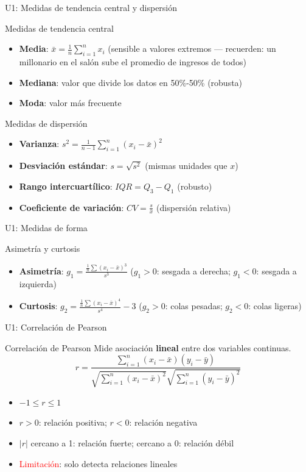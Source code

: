 \documentclass[aspectratio=169, 11pt]{beamer}
\begin{document}
\begin{frame}{U1: Medidas de tendencia central y dispersión}
\begin{block}{Medidas de tendencia central}
\begin{itemize}
\item \textbf{Media}: $\bar{x} = \frac{1}{n}\sum_{i=1}^{n}x_i$ (sensible a valores extremos --- recuerden: un millonario en el sal\'on sube el promedio de ingresos de todos)
\item \textbf{Mediana}: valor que divide los datos en 50\%-50\% (robusta)
\item \textbf{Moda}: valor m\'as frecuente
\end{itemize}
\end{block}

\begin{block}{Medidas de dispersión}
\begin{itemize}
\item \textbf{Varianza}: $s^2 = \frac{1}{n-1}\sum_{i=1}^{n}(x_i - \bar{x})^2$
\item \textbf{Desviación estándar}: $s = \sqrt{s^2}$ (mismas unidades que $x$)
\item \textbf{Rango intercuartílico}: $IQR = Q_3 - Q_1$ (robusto)
\item \textbf{Coeficiente de variación}: $CV = \frac{s}{\bar{x}}$ (dispersión relativa)
\end{itemize}
\end{block}
\end{frame}

\begin{frame}{U1: Medidas de forma}
\begin{block}{Asimetría y curtosis}
\begin{itemize}
\item \textbf{Asimetría}: $g_1 = \frac{\frac{1}{n}\sum(x_i - \bar{x})^3}{s^3}$ ($g_1 > 0$: sesgada a derecha; $g_1 < 0$: sesgada a izquierda)
\item \textbf{Curtosis}: $g_2 = \frac{\frac{1}{n}\sum(x_i - \bar{x})^4}{s^4} - 3$ ($g_2 > 0$: colas pesadas; $g_2 < 0$: colas ligeras)
\end{itemize}
\end{block}
\end{frame}

\begin{frame}{U1: Correlación de Pearson}
\begin{block}{Correlación de Pearson}
Mide asociación \textbf{lineal} entre dos variables continuas.
$$r = \frac{\sum_{i=1}^{n}(x_i - \bar{x})(y_i - \bar{y})}{\sqrt{\sum_{i=1}^{n}(x_i - \bar{x})^2}\sqrt{\sum_{i=1}^{n}(y_i - \bar{y})^2}}$$
\begin{itemize}
\item $-1 \leq r \leq 1$
\item $r > 0$: relación positiva; $r < 0$: relación negativa
\item $|r|$ cercano a 1: relación fuerte; cercano a 0: relación débil
\item \textcolor{red}{Limitación}: solo detecta relaciones lineales
\end{itemize}
\end{block}
\end{frame}
\end{document}
